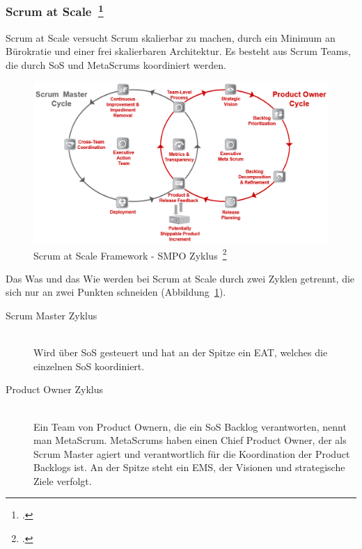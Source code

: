 \subsubsection[Scrum at Scale]{Scrum at Scale~\footcite[vgl.][]{scale}}

Scrum at Scale versucht Scrum skalierbar zu machen, durch ein Minimum an Bürokratie und einer frei skalierbaren Architektur.
Es besteht aus Scrum Teams, die durch \ac{SoS} und MetaScrums koordiniert werden. 
\begin{savenotes}
  \begin{figure}[H] 
    \centering
       \includegraphics[width=1.0\textwidth]{img/scrumatscale.png}
    \caption[Scrum at Scale Framework {-} SMPO Zyklus]{Scrum at Scale Framework {-} SMPO Zyklus~\footcite{scrumatscale_framework}}\label{fig:sas}
  \end{figure}
\end{savenotes}

Das Was und das Wie werden bei Scrum at Scale durch zwei Zyklen getrennt, die sich nur an zwei Punkten schneiden (Abbildung~\ref{fig:sas}).
\begin{description}
  \item[Scrum Master Zyklus] \hfill \\ Wird über \ac{SoS} gesteuert und hat an der Spitze ein \ac{EAT}, welches die einzelnen \ac{SoS} koordiniert.
  \item[Product Owner Zyklus] \hfill \\ Ein Team von Product Ownern, die ein \ac{SoS} Backlog verantworten, nennt man MetaScrum. MetaScrums haben einen Chief Product Owner, der als Scrum Master agiert und verantwortlich für die Koordination der Product Backlogs ist. An der Spitze steht ein \ac{EMS}, der Visionen und strategische Ziele verfolgt.
\end{description}

